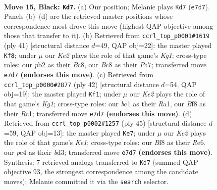 \documentclass[11pt]{article}
\begin{document}
\clearpage

\begin{figure}[p]\centering
\begin{subfigure}{0.46\textwidth}\centering
\resizebox{\linewidth}{!}{%
\newchessgame
\chessboard[
  setfen={r1b2b1r/p1p1kp1p/2p3p1/8/2P2P1P/8/PP4R1/RNB1K3 b Q - 0 15},
  showmover=false,
  pgfstyle=straightmove, color=movearrow, markmove={e7-d7}
]}
\caption{}
\end{subfigure}\hfill
\begin{subfigure}{0.46\textwidth}\centering
\resizebox{\linewidth}{!}{%
\newchessgame
\chessboard[
  setfen={r1br2k1/pp2pp1p/6p1/3P4/1RB1P3/4K3/2R2PPP/8 b - - 0 21},
  showmover=false,
  pgfstyle=straightmove, color=movearrow, markmove={g8-f8}
]}
\caption{}
\end{subfigure}
\\[4pt]
\begin{subfigure}{0.46\textwidth}\centering
\resizebox{\linewidth}{!}{%
\newchessgame
\chessboard[
  setfen={2r1r3/pp3p1k/7p/2np2p1/8/2B1P3/PP3PPP/R1R3K1 w - - 3 22},
  showmover=false,
  pgfstyle=straightmove, color=movearrow, markmove={g1-f1}
]}
\caption{}
\end{subfigure}\hfill
\begin{subfigure}{0.46\textwidth}\centering
\resizebox{\linewidth}{!}{%
\newchessgame
\chessboard[
  setfen={r1b1k3/2p3p1/2p1rp1p/p7/2R5/P1PB4/2P3PP/3R2K1 b - - 0 23},
  showmover=false,
  pgfstyle=straightmove, color=movearrow, markmove={e8-e7}
]}
\caption{}
\end{subfigure}
\caption{\textbf{Move 15, Black: \texttt{Kd7}.} (a) Our position; Melanie plays \texttt{Kd7} (\texttt{e7d7}). Panels (b)--(d) are the retrieved master positions whose correspondence most drove this move (highest QAP objective among those that transfer to it). (b) Retrieved from \texttt{ccrl\_top\_p0001\#1619} (ply 41) [structural distance $d$=49, QAP obj=22]: the master played \texttt{Kf8}; under $\mu$ our \emph{Ke2} plays the role of that game's \emph{Kg1}; cross-type roles: our \emph{p}b2 as their \emph{B}c8, our \emph{B}c8 as their \emph{P}a7; transferred move \texttt{e7d7} \textbf{(endorses this move)}. (c) Retrieved from \texttt{ccrl\_top\_p0000\#2877} (ply 42) [structural distance $d$=54, QAP obj=19]: the master played \texttt{Kf1}; under $\mu$ our \emph{Ke2} plays the role of that game's \emph{Kg1}; cross-type roles: our \emph{b}c1 as their \emph{R}a1, our \emph{B}f8 as their \emph{R}c1; transferred move \texttt{e7d7} \textbf{(endorses this move)}. (d) Retrieved from \texttt{ccrl\_top\_p0002\#1257} (ply 45) [structural distance $d$=59, QAP obj=13]: the master played \texttt{Ke7}; under $\mu$ our \emph{Ke2} plays the role of that game's \emph{Ke1}; cross-type roles: our \emph{B}f8 as their \emph{R}e6, our \emph{p}c4 as their \emph{b}d3; transferred move \texttt{e7d7} \textbf{(endorses this move)}. Synthesis: 7 retrieved analogs transferred to \texttt{Kd7} (summed QAP objective 93, the strongest correspondence among the candidate moves); Melanie committed it via the \texttt{search} selector.}
\label{fig:thought-m29}
\end{figure}
\end{document}
